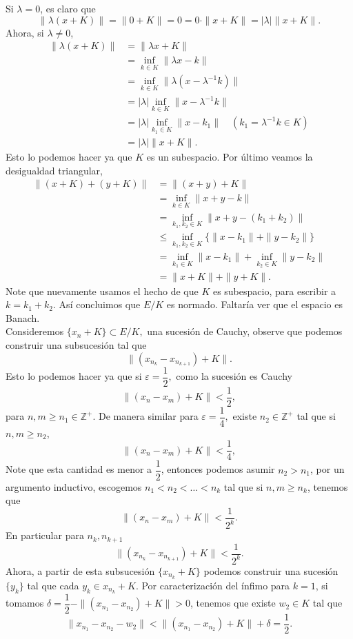 \begin{itemize}
\begin{itemize}
\begin{sproof}
            Si $\lambda=0$, es claro que 
            $$\|\lambda(x+K)\|=\|0+K\|=0=0\cdot\|x+K\|=|\lambda|\|x+K\|.$$
            Ahora, si $\lambda\neq 0$,
            \begin{align*}
                \|\lambda(x+K)\|&=\|\lambda x+K\|\\
                &=\inf_{k\in K}\|\lambda x-k\|\\
                &=\inf_{k\in K}\|\lambda(x-\lambda^{-1}k)\|\\
                &=|\lambda|\inf_{k\in K}\|x-\lambda^{-1}k\|\\
                &=|\lambda|\inf_{k_1\in K}\|x-k_1\|\quad (k_1=\lambda^{-1}k\in K)\\
                &=|\lambda|\|x+K\|.
            \end{align*}
             Esto lo podemos hacer ya que $K$ es un subespacio. Por último veamos la desigualdad triangular,
            \begin{align*}
                \|(x+K)+(y+K)\|&=\|(x+y)+K\|\\
                &=\inf_{k\in K}\|x+y-k\|\\
                &=\inf_{k_1,k_2\in K}\|x+y-(k_1+k_2)\|\\
                &\leq \inf_{k_1,k_2\in K}\{\|x-k_1\|+\|y-k_2\|\}\\
                &=\inf_{k_1\in K}\|x-k_1\|+\inf_{k_2\in K}\|y-k_2\|\\
                &=\|x+K\|+\|y+K\|.
            \end{align*}
            Note que nuevamente usamos el hecho de que $K$ es subespacio, para escribir a $k=k_1+k_2.$ Así concluimos que $E/K$ es normado. Faltaría ver que el espacio es Banach.\\

            Consideremos $\{x_n+K\}\subset E/K,$ una sucesión de Cauchy, observe que podemos construir una subsucesión tal que 
            $$\|(x_{n_k}-x_{n_{k+1}})+K\|.$$
            Esto lo podemos hacer ya que si $\varepsilon=\dfrac{1}{2},$ como la sucesión es Cauchy
            $$\|(x_n-x_m)+K\|<\dfrac{1}{2},$$
            para $n,m\geq n_1\in \mathbb{Z}^+$. De manera similar para $\varepsilon=\dfrac{1}{4},$ existe $n_2\in \mathbb{Z}^+$ tal que si $n,m\geq n_2$,
            $$\|(x_n-x_m)+K\|<\dfrac{1}{4},$$
            Note que esta cantidad es menor a $\dfrac{1}{2}$, entonces podemos asumir $n_2>n_1$, por un argumento inductivo, escogemos $n_1<n_2<\dots<n_k$ tal que si $n,m\geq n_k$, tenemos que
            $$\|(x_n-x_m)+K\|<\dfrac{1}{2^k}.$$
            En particular para $n_k,n_{k+1}$ 
            $$\|(x_{n_k}-x_{n_{k+1}})+K\|<\dfrac{1}{2^k}.$$
            Ahora, a partir de esta subsucesión $\{x_{n_k}+K\}$ podemos construir una sucesión $\{y_k\}$ tal que cada $y_k\in x_{n_k}+K$. Por caracterización del ínfimo para $k=1$, si tomamos $\delta=\dfrac{1}{2}-\|(x_{n_1}-x_{n_2})+K\|>0$, tenemos que existe $w_2\in K$ tal que
            $$\|x_{n_1}-x_{n_2}-w_2\|<\|(x_{n_1}-x_{n_2})+K\|+\delta=\dfrac{1}{2}.$$



\end{sproof}
\end{itemize}
\end{itemize}
